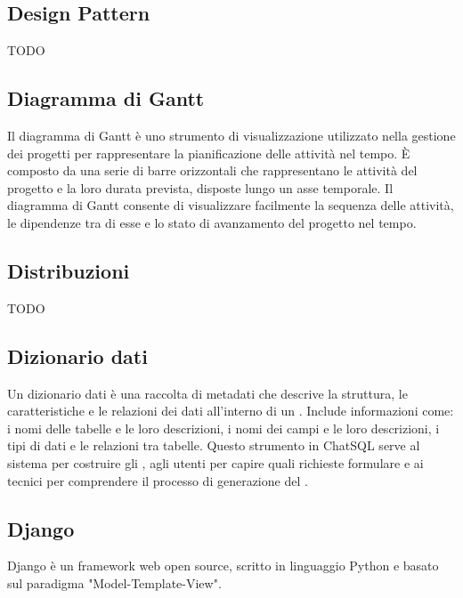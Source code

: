 \vspace{2em}
\subsection*{Design Pattern}
TODO

\vspace{2em}
\subsection*{Diagramma di Gantt}
Il diagramma di Gantt è uno strumento di visualizzazione utilizzato nella gestione dei progetti per rappresentare la pianificazione delle attività nel tempo. È composto da una serie di barre orizzontali che rappresentano le attività del progetto e la loro durata prevista, disposte lungo un asse temporale. Il diagramma di Gantt consente di visualizzare facilmente la sequenza delle attività, le dipendenze tra di esse e lo stato di avanzamento del progetto nel tempo.

\vspace{2em}
\subsection*{Distribuzioni}
TODO

\vspace{2em}
\subsection*{Dizionario dati}
Un dizionario dati è una raccolta di metadati che descrive la struttura, le caratteristiche e le relazioni dei dati all'interno di un . Include informazioni come: i nomi delle tabelle e le loro descrizioni, i nomi dei campi e le loro descrizioni, i tipi di dati e le relazioni tra tabelle. Questo strumento in ChatSQL serve al sistema per costruire gli , agli utenti per capire quali richieste formulare e ai tecnici per comprendere il processo di generazione del .

\vspace{2em}
\subsection*{Django}
\par Django è un framework web open source, scritto in linguaggio Python e basato sul paradigma "Model-Template-View".

\vspace{2em}
